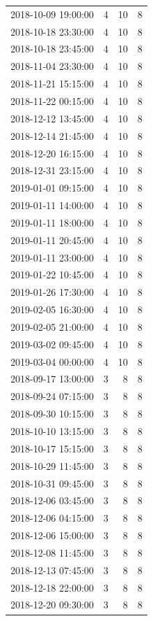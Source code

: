 \begin{tabular}{lrrr}
2018-10-09 19:00:00 & 4 & 10 & 8 \\
2018-10-18 23:30:00 & 4 & 10 & 8 \\
2018-10-18 23:45:00 & 4 & 10 & 8 \\
2018-11-04 23:30:00 & 4 & 10 & 8 \\
2018-11-21 15:15:00 & 4 & 10 & 8 \\
2018-11-22 00:15:00 & 4 & 10 & 8 \\
2018-12-12 13:45:00 & 4 & 10 & 8 \\
2018-12-14 21:45:00 & 4 & 10 & 8 \\
2018-12-20 16:15:00 & 4 & 10 & 8 \\
2018-12-31 23:15:00 & 4 & 10 & 8 \\
2019-01-01 09:15:00 & 4 & 10 & 8 \\
2019-01-11 14:00:00 & 4 & 10 & 8 \\
2019-01-11 18:00:00 & 4 & 10 & 8 \\
2019-01-11 20:45:00 & 4 & 10 & 8 \\
2019-01-11 23:00:00 & 4 & 10 & 8 \\
2019-01-22 10:45:00 & 4 & 10 & 8 \\
2019-01-26 17:30:00 & 4 & 10 & 8 \\
2019-02-05 16:30:00 & 4 & 10 & 8 \\
2019-02-05 21:00:00 & 4 & 10 & 8 \\
2019-03-02 09:45:00 & 4 & 10 & 8 \\
2019-03-04 00:00:00 & 4 & 10 & 8 \\
2018-09-17 13:00:00 & 3 & 8 & 8 \\
2018-09-24 07:15:00 & 3 & 8 & 8 \\
2018-09-30 10:15:00 & 3 & 8 & 8 \\
2018-10-10 13:15:00 & 3 & 8 & 8 \\
2018-10-17 15:15:00 & 3 & 8 & 8 \\
2018-10-29 11:45:00 & 3 & 8 & 8 \\
2018-10-31 09:45:00 & 3 & 8 & 8 \\
2018-12-06 03:45:00 & 3 & 8 & 8 \\
2018-12-06 04:15:00 & 3 & 8 & 8 \\
2018-12-06 15:00:00 & 3 & 8 & 8 \\
2018-12-08 11:45:00 & 3 & 8 & 8 \\
2018-12-13 07:45:00 & 3 & 8 & 8 \\
2018-12-18 22:00:00 & 3 & 8 & 8 \\
2018-12-20 09:30:00 & 3 & 8 & 8 \\

\end{tabular}

